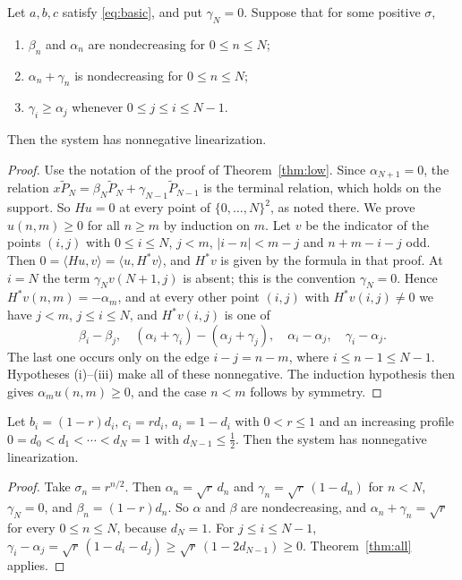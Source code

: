\begin{theorem}\label{thm:all}
Let $a,b,c$ satisfy \eqref{eq:basic}, and put $\gamma_N=0$. Suppose that for some positive $\sigma$,
\begin{enumerate}
\item $\beta_n$ and $\alpha_n$ are nondecreasing for $0\leq n\leq N$;
\item $\alpha_n+\gamma_n$ is nondecreasing for $0\leq n\leq N$;
\item $\gamma_i\geq\alpha_j$ whenever $0\leq j\leq i\leq N-1$.
\end{enumerate}
Then the system has nonnegative linearization.
\end{theorem}
\begin{proof}
Use the notation of the proof of Theorem~\ref{thm:low}. Since $\alpha_{N+1}=0$, the relation $x\widetilde P_N=\beta_N\widetilde P_N+\gamma_{N-1}\widetilde P_{N-1}$ is the terminal relation, which holds on the support. So $Hu=0$ at every point of $\{0,\ldots,N\}^2$, as noted there. We prove $u(n,m)\geq0$ for all $n\geq m$ by induction on $m$. Let $v$ be the indicator of the points $(i,j)$ with $0\leq i\leq N$, $j<m$, $|i-n|<m-j$ and $n+m-i-j$ odd. Then $0=\langle Hu,v\rangle=\langle u,H^*v\rangle$, and $H^*v$ is given by the formula in that proof. At $i=N$ the term $\gamma_Nv(N+1,j)$ is absent; this is the convention $\gamma_N=0$. Hence $H^*v(n,m)=-\alpha_m$, and at every other point $(i,j)$ with $H^*v(i,j)\neq0$ we have $j<m$, $j\leq i\leq N$, and $H^*v(i,j)$ is one of
\[
\beta_i-\beta_j,\quad (\alpha_i+\gamma_i)-(\alpha_j+\gamma_j),\quad \alpha_i-\alpha_j,\quad \gamma_i-\alpha_j.
\]
The last one occurs only on the edge $i-j=n-m$, where $i\leq n-1\leq N-1$. Hypotheses (i)--(iii) make all of these nonnegative. The induction hypothesis then gives $\alpha_mu(n,m)\geq0$, and the case $n<m$ follows by symmetry.
\end{proof}

\begin{corollary}\label{cor:heavy}
Let $b_i=(1-r)d_i$, $c_i=rd_i$, $a_i=1-d_i$ with $0<r\leq1$ and an increasing profile $0=d_0<d_1<\cdots<d_N=1$ with $d_{N-1}\leq\tfrac12$. Then the system has nonnegative linearization.
\end{corollary}
\begin{proof}
Take $\sigma_n=r^{n/2}$. Then $\alpha_n=\sqrt r\,d_n$ and $\gamma_n=\sqrt r\,(1-d_n)$ for $n<N$, $\gamma_N=0$, and $\beta_n=(1-r)d_n$. So $\alpha$ and $\beta$ are nondecreasing, and $\alpha_n+\gamma_n=\sqrt r$ for every $0\leq n\leq N$, because $d_N=1$. For $j\leq i\leq N-1$, $\gamma_i-\alpha_j=\sqrt r\,(1-d_i-d_j)\geq\sqrt r\,(1-2d_{N-1})\geq0$. Theorem~\ref{thm:all} applies.
\end{proof}

